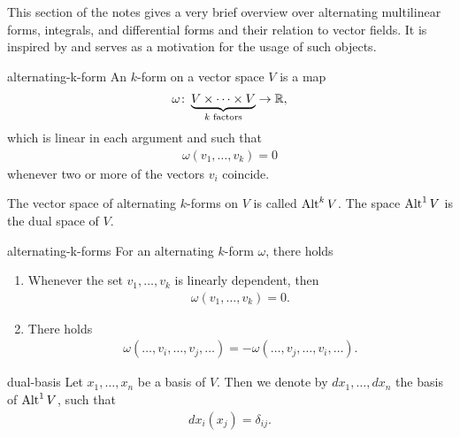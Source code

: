 \begin{intro}
  This section of the notes gives a very brief overview over
  alternating multilinear forms, integrals, and differential forms and
  their relation to vector fields. It is inspired by \cite{Hiptmair02}
  and serves as a motivation for the usage of such objects.
\end{intro}

\begin{Definition}{alternating-k-form}
  An  $k$-form on a vector space $V$ is a map
  \begin{gather}
    \omega\colon\underbrace{V\times \dots\times V}_{k \text{ factors}} \to \mathbb R,
  \end{gather}
  which is linear in each argument and such that
  \begin{gather}
    \omega(v_1,\dots,v_k) = 0
  \end{gather}
  whenever two or more of the vectors $v_i$ coincide.

  The vector space of alternating $k$-forms on $V$ is called
  $\operatorname{Alt}^k V$. The space $\operatorname{Alt}^1 V$ is the dual space of $V$.
\end{Definition}

\begin{Lemma}{alternating-k-forms}
  For an alternating $k$-form $\omega$, there holds
  \begin{enumerate}
  \item Whenever the set $v_1,\dots,v_k$ is linearly dependent, then
    \begin{gather}
      \omega(v_1,\dots,v_k) = 0.
    \end{gather}
  \item There holds
    \begin{gather}
      \omega(\ldots,v_i,\ldots,v_j,\ldots) = - \omega(\ldots,v_j,\ldots,v_i,\ldots).
    \end{gather}
  \end{enumerate}
\end{Lemma}

\begin{Notation}{dual-basis}
  Let $x_1,\dots,x_n$ be a basis of $V$. Then we denote by $dx_1,\dots,dx_n$ the basis of $\operatorname{Alt}^1V$,
  such that
  \begin{gather}
    dx_i(x_j) = \delta_{ij}.
  \end{gather}
\end{Notation}


